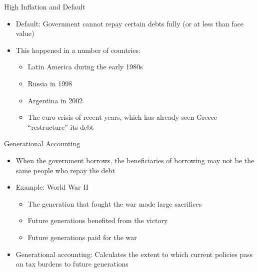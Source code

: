 \documentclass[aspectratio=1610]{beamer}
\begin{document}
\begin{frame}[wide]{High Inflation and Default}
	\begin{itemize}
		\item Default: Government cannot repay certain debts fully (or at less than face value)
		\vspace{6mm}
		\item This happened in a number of countries:
		\begin{itemize}
			\item Latin America during the early 1980s
			\item Russia in 1998
			\item Argentina in 2002 
			\item The euro crisis of recent years, which has already seen Greece “restructure” its debt
		\end{itemize}
	\end{itemize}
\end{frame}


\begin{frame}[wide]{Generational Accounting}
	\begin{itemize}
		\item When the government borrows, the beneficiaries of borrowing may not be the same people who repay the debt
		\vspace{5mm}
		\item Example: World War II
		\vspace{2mm}
		\begin{itemize}
			\item The generation that fought the war made large sacrifices
			\item Future generations benefited from the victory
			\item Future generations paid for the war
		\end{itemize}
		\vspace{5mm}
		\item Generational accounting: 	Calculates the extent to which current policies pass on tax burdens to future generations
		
	\end{itemize}
\end{frame}
\end{document}
